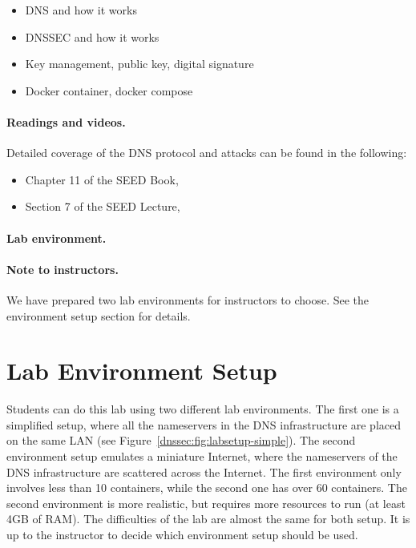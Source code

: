 \begin{itemize}[noitemsep]
\item DNS and how it works
\item DNSSEC and how it works
\item Key management, public key, digital signature 
\item Docker container, docker compose
\end{itemize}


\paragraph{Readings and videos.}
Detailed coverage of the DNS protocol and attacks can be found in the following:

\begin{itemize}
\item Chapter 11 of the SEED Book, \seedisbook
\item Section 7 of the SEED Lecture, \seedisvideo
\end{itemize}


\paragraph{Lab environment.} 
\seedenvironmentB
\nodependency

\paragraph{Note to instructors.} 
We have prepared two lab environments for instructors to choose. 
See the environment setup section for details. 


\section{Lab Environment Setup} 

Students can do this lab using two different lab environments. The first 
one is a simplified setup, where all the nameservers in the DNS infrastructure
are placed on the same LAN (see Figure~\ref{dnssec:fig:labsetup-simple}). 
The second environment setup emulates a miniature Internet, where 
the nameservers of the DNS infrastructure 
are scattered across the Internet. The first environment 
only involves less than 10 containers, while the second one has over 60 
containers. The second environment is more realistic, but requires 
more resources to run (at least 4GB of RAM). The difficulties of the 
lab are almost the same for both setup. It is up to the instructor 
to decide which environment setup should be used. 





